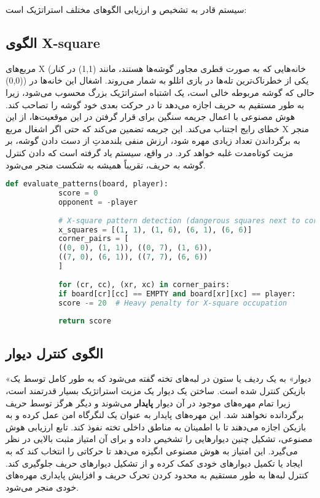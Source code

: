 \documentclass[12pt]{article}
\newenvironment{ltrcode}{\lr\bgroup}{\egroup}
\begin{document}
	سیستم قادر به تشخیص و ارزیابی الگوهای مختلف استراتژیک است:
	
	\subsection{الگوی X-square}
	
	مربع‌های X (خانه‌هایی که به صورت قطری مجاور گوشه‌ها هستند، مانند (1,1) در کنار (0,0)) یکی از خطرناک‌ترین تله‌ها در بازی اتللو به شمار می‌روند. اشغال این خانه‌ها در حالی که گوشه مربوطه خالی است، یک اشتباه استراتژیک بزرگ محسوب می‌شود، زیرا به طور مستقیم به حریف اجازه می‌دهد تا در حرکت بعدی خود گوشه را تصاحب کند. هوش مصنوعی با اعمال جریمه سنگین برای قرار گرفتن در این موقعیت‌ها، از این خطای رایج اجتناب می‌کند. این جریمه تضمین می‌کند که حتی اگر اشغال مربع X منجر به برگرداندن تعداد زیادی مهره شود، ارزش منفی بلندمدتِ از دست دادن گوشه، بر مزیت کوتاه‌مدت غلبه خواهد کرد. در واقع، سیستم یاد گرفته است که دادن کنترل گوشه به حریف، تقریباً همیشه به شکست منجر می‌شود.
	
	\begin{ltrcode}
		\begin{lstlisting}[language=Python, caption=X-Square Pattern Detection]
			def evaluate_patterns(board, player):
			score = 0
			opponent = -player
			
			# X-square pattern detection (dangerous squares next to corners)
			x_squares = [(1, 1), (1, 6), (6, 1), (6, 6)]
			corner_pairs = [
			((0, 0), (1, 1)), ((0, 7), (1, 6)), 
			((7, 0), (6, 1)), ((7, 7), (6, 6))
			]
			
			for (cr, cc), (xr, xc) in corner_pairs:
			if board[cr][cc] == EMPTY and board[xr][xc] == player:
			score -= 20  # Heavy penalty for X-square occupation
			
			return score
		\end{lstlisting}
	\end{ltrcode}

	\subsection{الگوی کنترل دیوار}
	
	«دیوار» به یک ردیف یا ستون در لبه‌های تخته گفته می‌شود که به طور کامل توسط یک بازیکن کنترل شده است. ساختن یک دیوار یک مزیت استراتژیک بسیار قدرتمند است، زیرا تمام مهره‌های موجود در آن دیوار \textbf{پایدار} می‌شوند و دیگر هرگز توسط حریف برگردانده نخواهند شد. این مهره‌های پایدار به عنوان یک لنگرگاه امن عمل کرده و به بازیکن اجازه می‌دهند تا با اطمینان به مناطق داخلی تخته نفوذ کند. تابع ارزیابی هوش مصنوعی، تشکیل چنین دیوارهایی را تشخیص داده و برای آن امتیاز مثبت بالایی در نظر می‌گیرد. این امتیاز به هوش مصنوعی انگیزه می‌دهد تا حرکاتی را انتخاب کند که به ایجاد یا تکمیل دیوارهای خودی کمک کرده و از تشکیل دیوارهای حریف جلوگیری کند. کنترل لبه‌ها به طور مستقیم به محدود کردن تحرک حریف و افزایش پایداری مهره‌های خودی منجر می‌شود.
	
\end{document}
